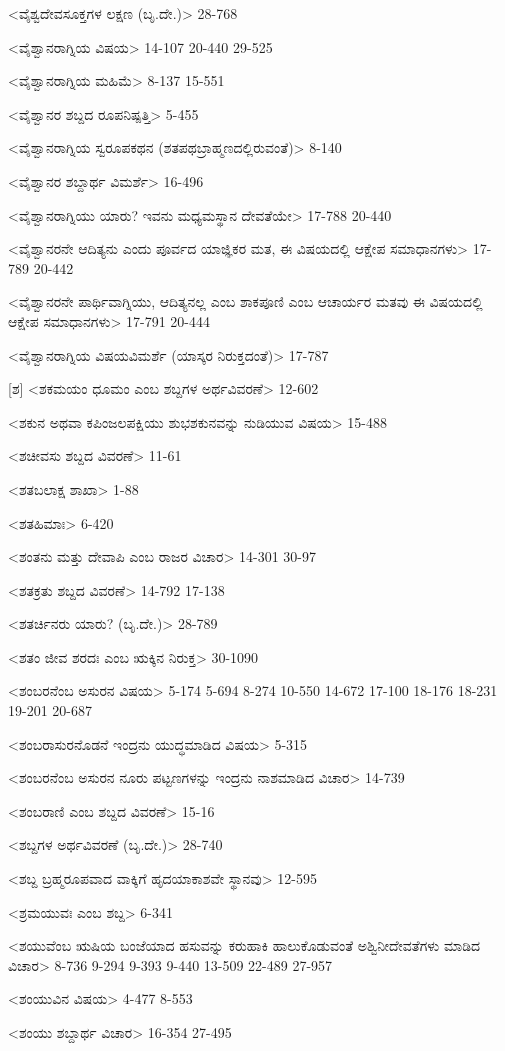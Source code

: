 <ವೈಶ್ವದೇವಸೂಕ್ತಗಳ ಲಕ್ಷಣ (ಬೃ.ದೇ.)>
28-768

<ವೈಶ್ವಾನರಾಗ್ನಿಯ ವಿಷಯ>
14-107
20-440
29-525


<ವೈಶ್ವಾನರಾಗ್ನಿಯ ಮಹಿಮೆ>
8-137
15-551

<ವೈಶ್ವಾನರ ಶಬ್ದದ ರೂಪನಿಷ್ಪತ್ತಿ>
5-455

<ವೈಶ್ವಾನರಾಗ್ನಿಯ ಸ್ವರೂಪಕಥನ (ಶತಪಥಬ್ರಾಹ್ಮಣದಲ್ಲಿರುವಂತೆ)>
8-140

<ವೈಶ್ವಾನರ ಶಬ್ದಾರ್ಥ ವಿಮರ್ಶೆ>
16-496

<ವೈಶ್ವಾನರಾಗ್ನಿಯು ಯಾರು? ಇವನು ಮಧ್ಯಮಸ್ಥಾನ ದೇವತೆಯೇ>
17-788 
20-440

<ವೈಶ್ವಾನರನೇ ಆದಿತ್ಯನು ಎಂದು ಪೂರ್ವದ ಯಾಜ್ಞಿಕರ ಮತ, ಈ ವಿಷಯದಲ್ಲಿ ಆಕ್ಷೇಪ ಸಮಾಧಾನಗಳು>
17-789 
20-442

<ವೈಶ್ವಾನರನೇ ಪಾರ್ಥಿವಾಗ್ನಿಯು, ಆದಿತ್ಯನಲ್ಲ ಎಂಬ ಶಾಕಪೂಣಿ ಎಂಬ ಆಚಾರ್ಯರ ಮತವು ಈ ವಿಷಯದಲ್ಲಿ ಆಕ್ಷೇಪ ಸಮಾಧಾನಗಳು>
17-791 
20-444

<ವೈಶ್ವಾನರಾಗ್ನಿಯ ವಿಷಯವಿಮರ್ಶೆ (ಯಾಸ್ಕರ ನಿರುಕ್ತದಂತೆ)>
17-787

[ಶ]
<ಶಕಮಯಂ ಧೂಮಂ ಎಂಬ ಶಬ್ದಗಳ ಅರ್ಥವಿವರಣೆ>
12-602

<ಶಕುನ ಅಥವಾ ಕಪಿಂಜಲಪಕ್ಷಿಯು ಶುಭಶಕುನವನ್ನು ನುಡಿಯುವ ವಿಷಯ>
15-488

<ಶಚೀವಸು ಶಬ್ದದ ವಿವರಣೆ>
11-61

<ಶತಬಲಾಕ್ಷ ಶಾಖಾ>
1-88

<ಶತಹಿಮಾಃ>
6-420

<ಶಂತನು ಮತ್ತು ದೇವಾಪಿ ಎಂಬ ರಾಜರ ವಿಚಾರ>
14-301
30-97

<ಶತಕ್ರತು ಶಬ್ದದ ವಿವರಣೆ>
14-792
17-138

<ಶತರ್ಚಿನರು ಯಾರು? (ಬೃ.ದೇ.)>
28-789


<ಶತಂ ಜೀವ ಶರದಃ ಎಂಬ ಋಕ್ಕಿನ ನಿರುಕ್ತ>
30-1090

<ಶಂಬರನೆಂಬ ಅಸುರನ ವಿಷಯ>
5-174 
5-694
8-274 
10-550
14-672
17-100
18-176
18-231
19-201
20-687

<ಶಂಬರಾಸುರನೊಡನೆ ಇಂದ್ರನು ಯುದ್ಧಮಾಡಿದ ವಿಷಯ>
5-315

<ಶಂಬರನೆಂಬ ಅಸುರನ ನೂರು ಪಟ್ಟಣಗಳನ್ನು ಇಂದ್ರನು ನಾಶಮಾಡಿದ ವಿಚಾರ>
14-739

<ಶಂಬರಾಣಿ ಎಂಬ ಶಬ್ದದ ವಿವರಣೆ>
15-16

<ಶಬ್ದಗಳ ಅರ್ಥವಿವರಣೆ (ಬೃ.ದೇ.)>
28-740

<ಶಬ್ದ ಬ್ರಹ್ಮರೂಪವಾದ ವಾಕ್ಕಿಗೆ ಹೃದಯಾಕಾಶವೇ ಸ್ಥಾನವು>
12-595

<ಶ್ರಮಯುವಃ ಎಂಬ ಶಬ್ದ>
6-341

<ಶಯುವೆಂಬ ಋಷಿಯ ಬಂಜೆಯಾದ ಹಸುವನ್ನು ಕರುಹಾಕಿ ಹಾಲುಕೊಡುವಂತೆ ಅಶ್ವಿನೀದೇವತೆಗಳು ಮಾಡಿದ ವಿಚಾರ>
8-736
9-294
9-393
9-440
13-509
22-489
27-957

<ಶಂಯುವಿನ ವಿಷಯ>
4-477
8-553

<ಶಂಯು ಶಬ್ದಾರ್ಥ ವಿಚಾರ>
16-354
27-495

